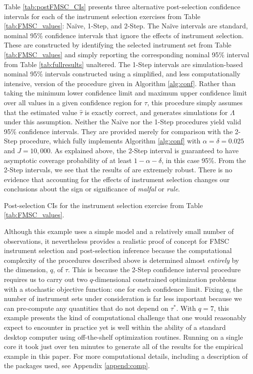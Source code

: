 Table \ref{tab:postFMSC_CIs} presents three alternative post-selection confidence intervals for each of the instrument selection exercises from Table \ref{tab:FMSC_values}: Na\"{i}ve, 1-Step, and 2-Step.
The Na\"{i}ve intervals are standard, nominal 95\% confidence intervals that ignore the effects of instrument selection.
These are constructed by identifying the selected instrument set from Table \ref{tab:FMSC_values} and simply reporting the corresponding nominal 95\% interval from Table \ref{tab:fullresults} unaltered.
The 1-Step intervals are simulation-based nominal 95\% intervals constructed using a simplified, and less computationally intensive, version of the procedure given in Algorithm \ref{alg:conf}.
Rather than taking the minimum lower confidence limit and maximum upper confidence limit over all values in a given confidence region for $\tau$, this procedure simply assumes that the estimated value $\widehat{\tau}$ is exactly correct, and generates simulations for $\Lambda$ under this assumption.
Neither the Na\"{i}ve nor the 1-Step procedures yield valid 95\% confidence intervals.
They are provided merely for comparison with the 2-Step procedure, which fully implements Algorithm \ref{alg:conf} with $\alpha = \delta = 0.025$ and $J=10,000$. 
As explained above, the 2-Step interval is guaranteed to have asymptotic coverage probability of at least $1 - \alpha - \delta$, in this case 95\%.
From the 2-Step intervals, we see that the results of \cite{Carstensen2006} are extremely robust. 
There is no evidence that accounting for the effects of instrument selection changes our conclusions about the sign or significance of \emph{malfal} or \emph{rule}.

\begin{table}[htbp]
	\centering
	
	\caption{Post-selection CIs for the instrument selection exercise from Table \ref{tab:FMSC_values}.}
	\label{tab:postFMSC_CIs}
\end{table}

Although this example uses a simple model and a relatively small number of observations, it nevertheless provides a realistic proof of concept for FMSC instrument selection and post-selection inference because the computational complexity of the procedures described above is determined almost \emph{entirely} by the dimension, $q$, of $\tau$. 
This is because the 2-Step confidence interval procedure requires us to carry out two $q$-dimensional constrained optimization problems with a stochastic objective function: one for each confidence limit.
Fixing $q$, the number of instrument sets under consideration is far less important because we can pre-compute any quantities that do not depend on $\tau^*$.
With $q = 7$, this example presents the kind of computational challenge that one would reasonably expect to encounter in practice yet is well within the ability of a standard desktop computer using off-the-shelf optimization routines.
Running on a single core it took just over ten minutes to generate all of the results for the empirical example in this paper.
For more computational details, including a description of the packages used, see Appendix \ref{append:comp}. 
